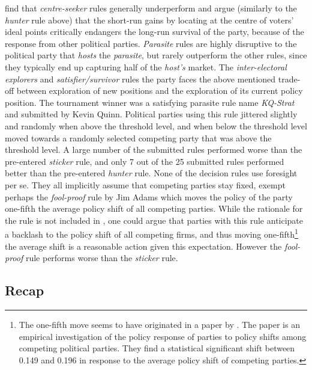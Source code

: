 \documentclass[preprint, 12pt]{elsarticle}
\begin{document}
\citet{Fowler_Laver_2008} find that \emph{centre-seeker} rules generally underperform and argue (similarly to the \emph{hunter} rule above) that the short-run gains by locating at the centre of voters' ideal points critically endangers the long-run survival of the party, because of the response from other political parties. \emph{Parasite} rules are highly disruptive to the political party that \emph{hosts} the \emph{parasite}, but rarely outperform the other rules, since they typically end up capturing half of the \emph{host's} market. The \emph{inter-electoral explorers} and \emph{satisfier/survivor} rules the party faces the above mentioned trade-off between exploration of new positions and the exploration of its current policy position. The tournament winner was a satisfying parasite rule name \emph{KQ-Strat} and submitted by Kevin Quinn. Political parties using this rule jittered slightly and randomly when above the threshold level, and when below the threshold level moved towards a randomly selected competing party that was above the threshold level. A large number of the submitted rules performed worse than the pre-entered \emph{sticker} rule, and only 7 out of the 25 submitted rules performed better than the pre-entered \emph{hunter} rule. None of the decision rules use foresight per se. They all implicitly assume that competing parties stay fixed, exempt perhaps the \emph{fool-proof} rule by Jim Adams which moves the policy of the party one-fifth the average policy shift of all competing parties. While the rationale for the rule is not included in \citet{Fowler_Laver_2008}, one could argue that parties with this rule anticipate a backlash to the policy shift of all competing firms, and thus moving one-fifth\footnote{The one-fifth move seems to have originated in a paper by \citet{Adams_Somer-Topcu_2009}. The paper is an empirical investigation of the policy response of parties to policy shifts among competing political parties. They find a statistical significant shift between 0.149 and 0.196 in response to the average policy shift of competing parties.} the average shift is a reasonable action given this expectation. However the \emph{fool-proof} rule performs worse than the \emph{sticker} rule.

\subsection*{Recap}
\end{document}
